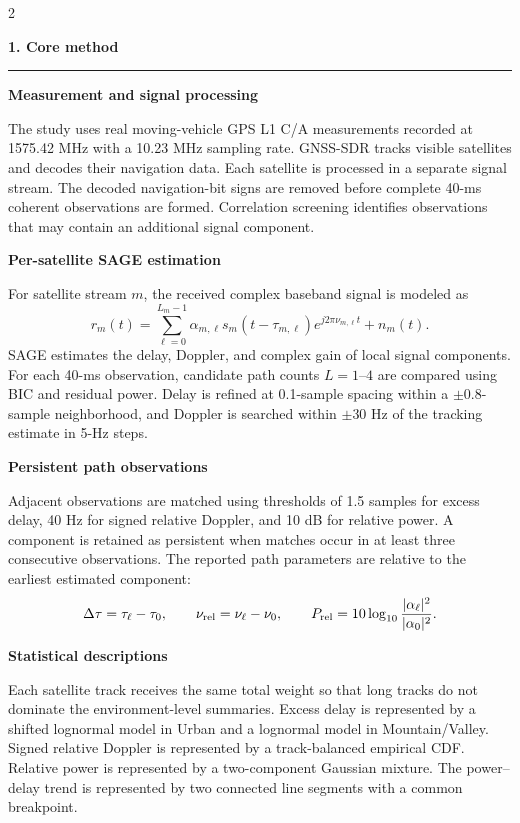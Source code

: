 \documentclass[10pt]{article}
\newcommand{\previewsection}[1]{%
  \vspace{4pt}\noindent\textbf{\large #1}\par\vspace{1pt}\hrule\vspace{3pt}}
\newcommand{\previewsubsection}[1]{%
  \vspace{2pt}\noindent\textbf{#1}\par\vspace{1pt}}
\begin{document}
\begin{multicols}{2}
\raggedcolumns
\small

\previewsection{1. Core method}

\previewsubsection{Measurement and signal processing}
The study uses real moving-vehicle GPS L1 C/A measurements recorded at 1575.42 MHz with a 10.23 MHz sampling rate. GNSS-SDR tracks visible satellites and decodes their navigation data. Each satellite is processed in a separate signal stream. The decoded navigation-bit signs are removed before complete 40-ms coherent observations are formed. Correlation screening identifies observations that may contain an additional signal component.

\previewsubsection{Per-satellite SAGE estimation}
For satellite stream $m$, the received complex baseband signal is modeled as
\begin{equation*}
r_m(t)=\sum_{\ell=0}^{L_m-1}\alpha_{m,\ell}s_m(t-\tau_{m,\ell})e^{j2\pi\nu_{m,\ell}t}+n_m(t).
\end{equation*}
SAGE estimates the delay, Doppler, and complex gain of local signal components. For each 40-ms observation, candidate path counts $L=1$--$4$ are compared using BIC and residual power. Delay is refined at 0.1-sample spacing within a $\pm0.8$-sample neighborhood, and Doppler is searched within $\pm30$ Hz of the tracking estimate in 5-Hz steps.

\previewsubsection{Persistent path observations}
Adjacent observations are matched using thresholds of 1.5 samples for excess delay, 40 Hz for signed relative Doppler, and 10 dB for relative power. A component is retained as persistent when matches occur in at least three consecutive observations. The reported path parameters are relative to the earliest estimated component:
\begin{equation*}
\Delta\tau=\tau_\ell-\tau_0,\qquad \nu_{\rm rel}=\nu_\ell-\nu_0,\qquad
P_{\rm rel}=10\log_{10}\frac{|\alpha_\ell|^2}{|\alpha_0|^2}.
\end{equation*}

\previewsubsection{Statistical descriptions}
Each satellite track receives the same total weight so that long tracks do not dominate the environment-level summaries. Excess delay is represented by a shifted lognormal model in Urban and a lognormal model in Mountain/Valley. Signed relative Doppler is represented by a track-balanced empirical CDF. Relative power is represented by a two-component Gaussian mixture. The power--delay trend is represented by two connected line segments with a common breakpoint.


\end{multicols}
\end{document}
